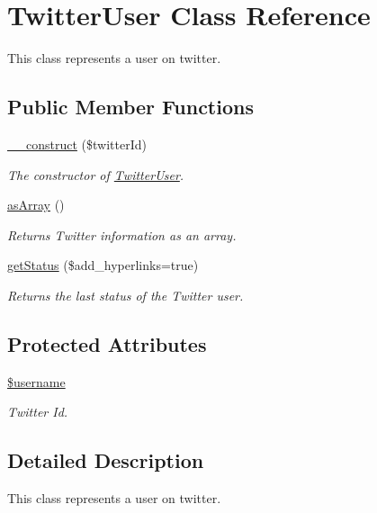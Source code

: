 \hypertarget{class_twitter_user}{
\section{TwitterUser Class Reference}
\label{class_twitter_user}
}


This class represents a user on twitter.  


\subsection*{Public Member Functions}
\begin{DoxyCompactItemize}
\item 
\hyperlink{class_twitter_user_aac09b350e318425625ba5766fdd28118}{\_\-\_\-construct} (\$twitterId)
\begin{DoxyCompactList}\small\item\em The constructor of \hyperlink{class_twitter_user}{TwitterUser}. \end{DoxyCompactList}\item 
\hyperlink{class_twitter_user_a0badd8e7ffdf4e7c30f4954d782efc21}{asArray} ()
\begin{DoxyCompactList}\small\item\em Returns Twitter information as an array. \end{DoxyCompactList}\item 
\hyperlink{class_twitter_user_adee94bac47124658a438a57f9ceb0fae}{getStatus} (\$add\_\-hyperlinks=true)
\begin{DoxyCompactList}\small\item\em Returns the last status of the Twitter user. \end{DoxyCompactList}\end{DoxyCompactItemize}
\subsection*{Protected Attributes}
\begin{DoxyCompactItemize}
\item 
\hyperlink{class_twitter_user_a344e34fc6dcf01c488347d4146cd8de9}{\$username}
\begin{DoxyCompactList}\small\item\em Twitter Id. \end{DoxyCompactList}\end{DoxyCompactItemize}


\subsection{Detailed Description}
This class represents a user on twitter. 

